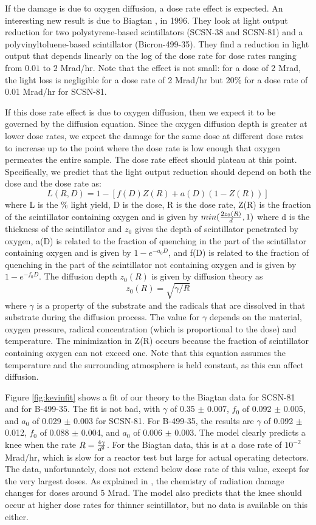 If the damage is due to oxygen diffusion, a dose rate effect
is expected.
An interesting new result is due to Biagtan \etal \cite{Biagtan1996125}, in 1996.  They look at light output reduction for two
polystyrene-based scintillators (SCSN-38 and SCSN-81) and a
polyvinyltoluene-based scintillator (Bicron-499-35).  
They find a reduction in light output that depends linearly on the
log of the dose rate for dose rates ranging from $0.01$ to
$2$ Mrad/hr.  Note that the effect is not small: for a
dose of 2 Mrad, the light loss is negligible for a dose rate
of 2 Mrad/hr but 20\% for a dose rate of 0.01 Mrad/hr for SCSN-81.

If this dose rate effect is due to oxygen diffusion, then
we expect it to be governed by the diffusion equation.  Since
the oxygen diffusion depth is greater at lower dose rates,
we expect the damage for the same dose at different dose rates to
increase up to the point where the dose rate is low enough that oxygen
permeates the entire sample.  The dose rate effect should plateau
at this point.  Specifically, we predict that the light output
reduction should depend on both the dose and the dose rate as:
$$ L(R,D) = 1 - [f(D)Z(R) + a(D)(1-Z(R))]$$
where L is the \% light yield, D is the dose, R is the dose rate, 
Z(R) is the fraction of the scintillator containing 
oxygen and is given by $min({{2 z_0(R)}\over{d}},1)$
where d is the thickness of the scintillator and $z_0$ gives
the depth of scintillator penetrated by oxygen,
a(D) is related to the fraction of quenching in the part of
the scintillator containing oxygen and is given by $1-e^{-a_0 D}$, 
and
f(D) is related to the fraction of quenching in the part of
the scintillator not containing oxygen and is given by $1-e^{-f_0 D}$.
The diffusion depth $z_0(R)$ is given by diffusion theory as 
$$z_0(R)=\sqrt{\gamma/R}$$
where $\gamma$ is a property of the substrate and the radicals that
are dissolved in that substrate during the diffusion process.
The value for $\gamma$ depends on the material, oxygen pressure,
radical concentration (which is proportional to the dose) and 
temperature.
The minimization in Z(R) occurs because the fraction of scintillator
containing oxygen can not exceed one.  Note that this equation 
assumes the temperature and the surrounding atmosphere
is held constant, as this can 
affect diffusion.

Figure \ref{fig:kevinfit} shows a fit of our theory to the Biagtan data 
\cite{Biagtan1996125} for SCSN-81 and for B-499-35.  The fit is not bad,
with 
$\gamma$ of 0.35 $\pm$ 0.007, $f_0$ of 0.092 $\pm$ 0.005,
and $a_0$ of 0.029 $\pm$ 0.003 
for SCSN-81.  For B-499-35, the results
are 
$\gamma$ of 0.092 $\pm$ 0.012, $f_0$ of 0.088 $\pm$ 0.004,
and $a_0$ of 0.006 $\pm$ 0.003. 
The model clearly predicts a knee when the rate $R={{4 \gamma}\over{d^2}}$.
For the Biagtan data, this is at a dose rate of $10^{-2}$ Mrad/hr, which is
slow for a reactor test but large for actual operating detectors.
The data, unfortunately, does not extend below dose rate of this value,
except for the very largest doses.  As explained in \cite{harrah},
the chemistry of radiation damage changes for doses
around 5 Mrad.
The model also predicts that the knee should occur at higher
dose rates for thinner scintillator, but no data is available
on this either.


